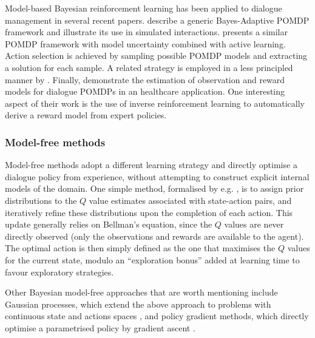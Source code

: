 Model-based Bayesian reinforcement learning has been applied to dialogue management in several recent papers.  \cite{DBLP:journals/jstsp/PngPC12} describe a generic Bayes-Adaptive POMDP framework and illustrate its use in simulated interactions. \cite{Doshi:2008:SLI:1463279.1463284} presents a similar POMDP framework with model uncertainty combined with active learning.  Action selection is achieved by sampling possible POMDP models and extracting a solution for each sample. A related strategy is employed in a less principled manner by \cite{DBLP:conf/iui/AtrashP09}.  Finally, \cite{ChinaeiC12,chinaei2012} demonstrate the estimation of observation and reward models for dialogue POMDPs in an healthcare application.  One interesting aspect of their work is the use of inverse reinforcement learning to automatically derive a reward model from expert policies.

\subsubsection*{Model-free methods}

Model-free methods adopt a different learning strategy and directly optimise a dialogue policy from experience, without attempting to construct explicit internal models of the domain. One simple method, formalised by e.g. \cite{Dearden:1998}, is to assign prior distributions to the $Q$ value estimates associated with state-action pairs, and iteratively refine these distributions upon the completion of each action. This update generally relies on Bellman's equation, since the $Q$ values are never directly observed (only the observations and rewards are available to the agent). The optimal action is then simply defined as the one that maximises the $Q$ values for the current state, modulo an ``exploration bonus'' added at learning time to favour exploratory strategies. 

Other Bayesian model-free approaches that are worth mentioning include Gaussian processes, which extend the above approach to problems with continuous state and actions spaces \citep{Engel:2005}, and policy gradient methods, which directly optimise a parametrised policy by gradient ascent \citep{bb-ihgbps-01,GhavamzadehE06}.  


